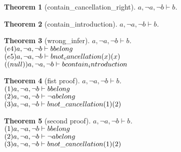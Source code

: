 \documentclass[11pt]{article}
\newtheorem{theorem}{Theorem}
\def\turn{\vdash}
\begin{document}
\begin{theorem}[contain_cancellation_right] $ a, \neg a, \neg b \turn b $.\\
\end{theorem}
\begin{theorem}[contain_introduction] $ a, \neg a, \neg b \turn b $.\\
\end{theorem}
\begin{theorem}[wrong_infer] $ a, \neg a, \neg b \turn b $.\\
$(e4)a, \neg a, \neg b \turn b \hfill belong  $\\
$(e5)a, \neg a, \neg b \turn b \hfill not_cancellation (x)(x) $\\
$((null))a, \neg a, \neg b \turn b \hfill contain_introduction  $\\
\end{theorem}
\begin{theorem}[fist proof] $ a, \neg a, \neg b \turn b $.\\
$(1)a, \neg a, \neg b \turn b \hfill belong $\\
$(2)a, \neg a, \neg b \turn \neg a \hfill belong $\\
$(3)a, \neg a, \neg b \turn b \hfill not \_ cancellation (1)(2) $\\
\end{theorem}
\begin{theorem}[second proof] $ a, \neg a, \neg b \turn b $.\\
$(1)a, \neg a, \neg b \turn b \hfill belong $\\
$(2)a, \neg a, \neg b \turn \neg a \hfill belong $\\
$(3)a, \neg a, \neg b \turn b \hfill not \_ cancellation (1)(2) $\\
\end{theorem}
\end{document}
